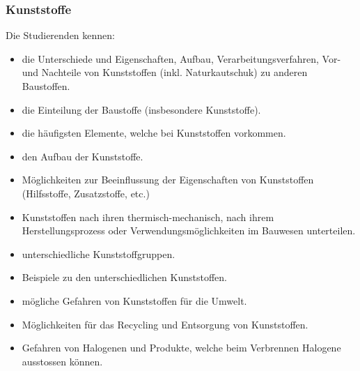 \subsubsection*{Kunststoffe}
Die Studierenden kennen: 

\begin{itemize}[noitemsep]
	\item die Unterschiede und Eigenschaften, Aufbau, Verarbeitungsverfahren, Vor- und Nachteile von Kunststoffen (inkl. Naturkautschuk) zu anderen Baustoffen. 
	\item die Einteilung der Baustoffe (insbesondere Kunststoffe).
	\item die häufigsten Elemente, welche bei Kunststoffen vorkommen.
	\item den Aufbau der Kunststoffe.
	\item Möglichkeiten zur Beeinflussung der Eigenschaften von Kunststoffen (Hilfsstoffe, Zusatzstoffe, etc.)
	\item Kunststoffen nach ihren thermisch-mechanisch, nach ihrem Herstellungsprozess oder Verwendungsmöglichkeiten im Bauwesen unterteilen.
	\item unterschiedliche Kunststoffgruppen.
	\item Beispiele zu den unterschiedlichen Kunststoffen.
	\item mögliche Gefahren von Kunststoffen für die Umwelt.
	\item Möglichkeiten für das Recycling und Entsorgung von Kunststoffen.
	\item Gefahren von Halogenen und Produkte, welche beim Verbrennen Halogene ausstossen können.
\end{itemize}